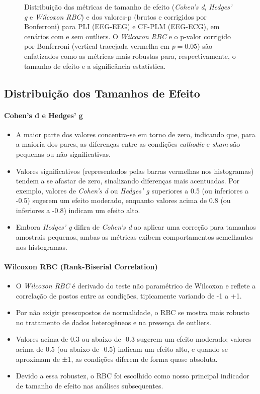 \begin{figure}[htb]
{    }
    \caption[Distribuições de tamanhos de efeito e valores-p]{Distribuição das métricas de tamanho de efeito (\emph{Cohen's d}, \emph{Hedges' g} e \emph{Wilcoxon RBC}) e dos valores-p (brutos e corrigidos por Bonferroni) para PLI (EEG-EEG) e CF-PLM (EEG-ECG), em cenários com e sem outliers. O \emph{Wilcoxon RBC} e o p-valor corrigido por Bonferroni (vertical tracejada vermelha em $p=0.05$) são enfatizados como as métricas mais robustas para, respectivamente, o tamanho de efeito e a significância estatística.}
    \label{fig:effectsizehist_all}
\end{figure}
\subsection{Distribuição dos Tamanhos de Efeito}

\paragraph{Cohen's d e Hedges' g}
\begin{itemize}
    \item A maior parte dos valores concentra-se em torno de zero, indicando que, para a maioria dos pares, as diferenças entre as condições \emph{cathodic} e \emph{sham} são pequenas ou não significativas.
    \item Valores significativos (representados pelas barras vermelhas nos histogramas) tendem a se afastar de zero, sinalizando diferenças mais acentuadas. Por exemplo, valores de \emph{Cohen's d} ou \emph{Hedges' g} superiores a 0.5 (ou inferiores a -0.5) sugerem um efeito moderado, enquanto valores acima de 0.8 (ou inferiores a -0.8) indicam um efeito alto.
    \item Embora \emph{Hedges' g} difira de \emph{Cohen's d} ao aplicar uma correção para tamanhos amostrais pequenos, ambas as métricas exibem comportamentos semelhantes nos histogramas.
\end{itemize}

\paragraph{Wilcoxon RBC (Rank-Biserial Correlation)}
\begin{itemize}
    \item O \emph{Wilcoxon RBC} é derivado do teste não paramétrico de Wilcoxon e reflete a correlação de postos entre as condições, tipicamente variando de -1 a +1.
    \item Por não exigir pressupostos de normalidade, o RBC se mostra mais robusto no tratamento de dados heterogêneos e na presença de outliers.
    \item Valores acima de 0.3 ou abaixo de -0.3 sugerem um efeito moderado; valores acima de 0.5 (ou abaixo de -0.5) indicam um efeito alto, e quando se aproximam de ±1, as condições diferem de forma quase absoluta.
    \item Devido a essa robustez, o RBC foi escolhido como nosso principal indicador de tamanho de efeito nas análises subsequentes.
\end{itemize}

